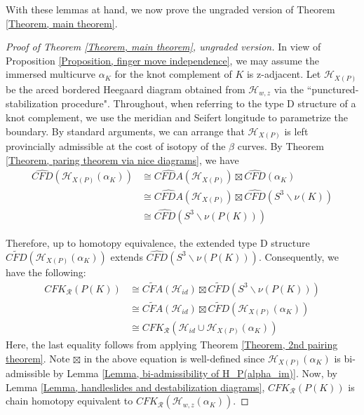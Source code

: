 \documentclass{amsart}
\theoremstyle{definition}
\theoremstyle{remark}
\numberwithin{equation}{section}
\numberwithin{equation}{section} \makeatletter
\begin{document}
With these lemmas at hand, we now prove the ungraded version of Theorem \ref{Theorem, main theorem}.
\begin{proof}[Proof of Theorem \ref{Theorem, main theorem}, ungraded version]
In view of Proposition \ref{Proposition, finger move independence}, we may assume the immersed multicurve $\alpha_K$ for the knot complement of $K$ is z-adjacent. Let $\mathcal{H}_{X(P)}$ be the arced bordered Heegaard diagram obtained from $\mathcal{H}_{w,z}$ via the ``punctured-stabilization procedure". Throughout, when referring to the type D structure of a knot complement, we use the meridian and Seifert longitude to parametrize the boundary. By standard arguments, we can arrange that  $\mathcal{H}_{X(P)}$ is left provincially admissible at the cost of isotopy of the $\beta$ curves. By Theorem \ref{Theorem, paring theorem via nice diagrams}, we have 
\begin{displaymath}
\begin{aligned}
\widehat{CFD}(\mathcal{H}_{X(P)}(\alpha_K))&\cong \widehat{CFDA}(\mathcal{H}_{X(P)})\boxtimes \widehat{CFD}(\alpha_K)\\
&\cong\widehat{CFDA}(\mathcal{H}_{X(P)})\boxtimes \widehat{CFD}(S^3 \backslash \nu(K))\\
&\cong \widehat{CFD}(S^3\backslash \nu(P(K)))
\end{aligned}
\end{displaymath}


Therefore, up to homotopy equivalence, the extended type D structure $\widetilde{CFD}(\mathcal{H}_{X(P)}(\alpha_K))$ extends $\widehat{CFD}(S^3\backslash \nu(P(K)))$. Consequently, we have the following:
\begin{displaymath}
\begin{aligned}
CFK_{\mathcal{R}}(P(K))&\cong \widetilde{CFA}(\mathcal{H}_{id}){\boxtimes}\widetilde{CFD}(S^3\backslash \nu(P(K)))\\
&\cong \widetilde{CFA}(\mathcal{H}_{id}){\boxtimes}\widetilde{CFD}(\mathcal{H}_{X(P)}(\alpha_K))\\
&\cong CFK_{\mathcal{R}}(\mathcal{H}_{id}\cup \mathcal{H}_{X(P)}(\alpha_K))
\end{aligned}
\end{displaymath}
Here, the last equality follows from applying Theorem \ref{Theorem, 2nd pairing theorem}.
Note ${\boxtimes}$ in the above equation is well-defined since $\mathcal{H}_{X(P)}(\alpha_K)$ is bi-admissible by Lemma \ref{Lemma, bi-admissibility of H_P(alpha_im)}. Now, by Lemma \ref{Lemma, handleslides and destabilization diagrams}, $CFK_{\mathcal{R}}(P(K))$ is chain homotopy equivalent to $CFK_{\mathcal{R}}(\mathcal{H}_{w,z}(\alpha_K))$. 
\end{proof}
\end{document}
